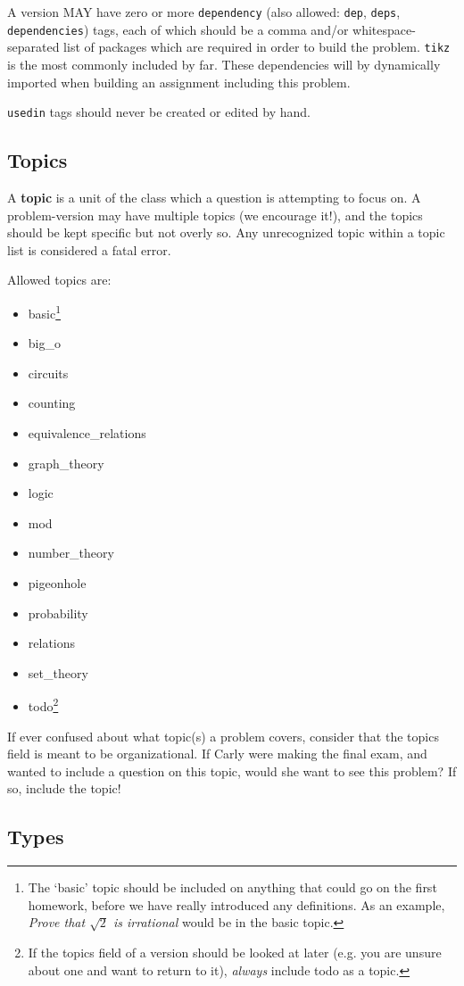     A version MAY have zero or more \texttt{dependency} (also allowed: \texttt{dep}, \texttt{deps}, \texttt{dependencies}) tags, each of which should be a comma and/or whitespace-separated list of packages which are required in order to build the problem. \texttt{tikz} is the most commonly included by far. These dependencies will by dynamically imported when building an assignment including this problem.
    
    \texttt{usedin} tags should never be created or edited by hand.
  
  \subsection{Topics}
    A \textbf{topic} is a unit of the class which a question is attempting to focus on. A problem-version may have multiple topics (we encourage it!), and the topics should be kept specific but not overly so. Any unrecognized topic within a topic list is considered a fatal error.
    
    Allowed topics are:
    \begin{itemize}\itemsep0pt
      \item basic\footnote{The `basic' topic should be included on anything that could go on the first homework, before we have really introduced any definitions. As an example, \textit{Prove that $\sqrt 2$ is irrational} would be in the basic topic.}
      \item big\_o
      \item circuits
      \item counting
      \item equivalence\_relations
      \item graph\_theory
      \item logic
      \item mod
      \item number\_theory
      \item pigeonhole
      \item probability
      \item relations
      \item set\_theory
      \item todo\footnote{If the topics field of a version should be looked at later (e.g. you are unsure about one and want to return to it), \textit{always} include todo as a topic.}
    \end{itemize}
    
    If ever confused about what topic(s) a problem covers, consider that the topics field is meant to be organizational. If Carly were making the final exam, and wanted to include a question on this topic, would she want to see this problem? If so, include the topic!
  
  \subsection{Types}
    